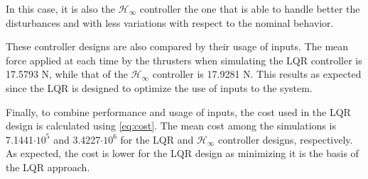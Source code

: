 In this case, it is also the $\mathcal{H}_\infty$ controller the one that is able to handle better the disturbances and with less variations with respect to the nominal behavior.

These controller designs are also compared by their usage of inputs. The mean force applied at each time by the thrusters when simulating the LQR controller is \num{17.5793} N, while that of the $\mathcal{H}_\infty$ controller is \num{17.9281} N. This results as expected since the LQR is designed to optimize the use of inputs to the system.

Finally, to combine performance and usage of inputs, the cost used in the LQR design is calculated using \autoref{eq:cost}. The mean cost among the simulations is \num{7.1441}$\cdot 10^5$ and \num{3.4227}$\cdot 10^6$ for the LQR and $\mathcal{H}_\infty$ controller designs, respectively. As expected, the cost is lower for the LQR design as minimizing it is the basis of the LQR approach.



